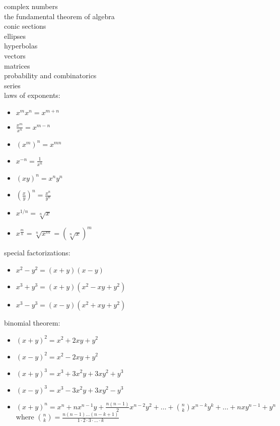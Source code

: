 \documentclass{article}
\begin{document}
complex numbers\\

the fundamental theorem of algebra\\	

conic sections\\
	ellipses\\
	hyperbolas\\
	
vectors\\

matrices\\

probability and combinatorics\\

series\\

laws of exponents: 
	\begin{itemize}
		\item $x^mx^n = x^{m+n}$
		\item $\frac{x^m}{x^n} = x^{m-n}$
		\item $(x^m)^n = x^{mn}$
		\item $x^{-n} = \frac{1}{x^n}$
		\item $(xy)^n = x^ny^n$
		\item $(\frac{x}{y})^n = \frac{x^n}{y^n}$ \item $x^{1/n} = \sqrt[n]{x}$
		\item $x^{\frac{m}{n}} = \sqrt[n]{x^m} = (\sqrt[n]{x})^m$
	\end{itemize}

special factorizations:
	\begin{itemize}
		\item $x^2 - y^2 = (x + y)(x - y)$
		\item $x^3 + y^3 = (x + y)(x^2 - xy + y^2)$
		\item $x^3 - y^3 = (x - y)(x^2 + xy + y^2)$
	\end{itemize}

binomial theorem:
	\begin{itemize}
		\item $(x + y)^2 = x^2 + 2xy + y^2$
		\item $(x - y)^2 = x^2 - 2xy + y^2$
		\item $(x + y)^3 = x^3 + 3x^2y + 3xy^2 + y^3$
		\item $(x - y)^3 = x^3 - 3x^2y + 3xy^2 - y^3$
		\item $(x + y)^n = x^n + nx^{n-1}y + \frac{n(n-1)}{2}x^{n-2}y^2 + \ldots + \binom{n}{k}x^{n-k}y^k + \dots + nxy^{n-1} + y^n$
			where $\binom{n}{k} = \frac{n(n-1) \dots (n-k+1)}{1 \cdot 2 \cdot 3 \cdot \ldots \cdot k}$
	\end{itemize}
\end{document}
